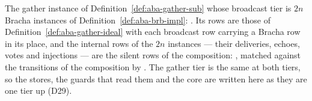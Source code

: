 \begin{definition}
  \label{def:aba-gather-low}
  \leanok
  The gather instance of Definition~\ref{def:aba-gather-sub} whose broadcast tier is $2n$ Bracha instances of Definition~\ref{def:aba-brb-impl}: .
  Its rows are those of Definition~\ref{def:aba-gather-ideal} with each broadcast row carrying a Bracha row in its place, and the internal rows of the $2n$ instances --- their deliveries, echoes, votes and injections --- are the silent rows of the composition: , matched against the transitions of the composition by .
  The gather tier is the same at both tiers, so the stores, the guards that read them and the core are written here as they are one tier up (D29).
\end{definition}
